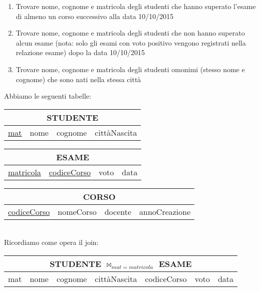 \documentclass[a4paper]{article}
\begin{document}
\begin{enumerate}
  \item Trovare nome, cognome e matricola degli studenti che hanno superato l'esame di almeno un corso successivo alla data 10/10/2015
  \item Trovare nome, cognome e matricola degli studenti che non hanno superato alcun esame (nota: solo gli esami con voto positivo vengono registrati nella relazione esame) dopo la data 10/10/2015
  \item Trovare nome, cognome e matricola degli studenti omonimi (stesso nome e cognome) che sono nati nella stessa città
\end{enumerate}

\begin{mybox}{}
  Abbiamo le seguenti tabelle:\medskip\\
  \begin{tabular}{|c|c|c|c|}
    \hline
    \multicolumn{4}{|c|}{STUDENTE}\\
    \hline
    \underline{mat} & nome & cognome & cittàNascita\\
    \hline
  \end{tabular}
\medskip

\begin{tabular}{|c|c|c|c|}
  \hline
  \multicolumn{4}{|c|}{ESAME}\\
  \hline
  \underline{matricola} & \underline{codiceCorso} & voto & data\\
  \hline
\end{tabular}
\medskip

\begin{tabular}{|c|c|c|c|}
  \hline
  \multicolumn{4}{|c|}{CORSO}\\
  \hline
  \underline{codiceCorso} & nomeCorso & docente & annoCreazione\\
  \hline
\end{tabular}
\medskip\medskip\\
%
Ricordiamo come opera il join:\medskip\\
\begin{tabular}{|c|c|c|c|c|c|c|}
  \hline
  \multicolumn{7}{|c|}{STUDENTE $\Join_{mat=matricola}$ ESAME}\\
  \hline
  mat & nome & cognome & cittàNascita & codiceCorso & voto & data\\
  \hline
\end{tabular}
\medskip


\end{mybox}
\end{document}
